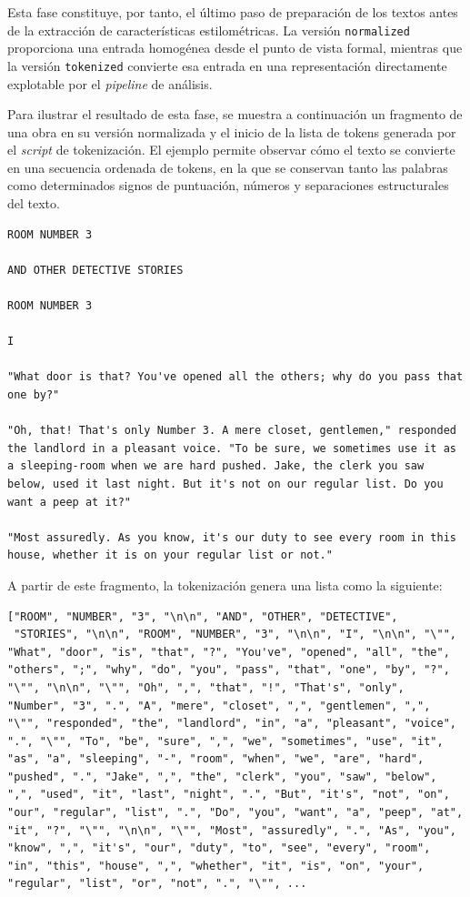 \documentclass[IB]{TFUOC}%
\begin{document}
Esta fase constituye, por tanto, el último paso de preparación de los textos antes de la extracción de características estilométricas. La versión \texttt{normalized} proporciona una entrada homogénea desde el punto de vista formal, mientras que la versión \texttt{tokenized} convierte esa entrada en una representación directamente explotable por el \textit{pipeline} de análisis.

Para ilustrar el resultado de esta fase, se muestra a continuación un fragmento de una obra en su versión normalizada y el inicio de la lista de tokens generada por el \textit{script} de tokenización. El ejemplo permite observar cómo el texto se convierte en una secuencia ordenada de tokens, en la que se conservan tanto las palabras como determinados signos de puntuación, números y separaciones estructurales del texto.

\begin{Verbatim}[breaklines=true, breakanywhere=true, breaksymbolleft={}]
ROOM NUMBER 3

AND OTHER DETECTIVE STORIES

ROOM NUMBER 3

I

"What door is that? You've opened all the others; why do you pass that one by?"

"Oh, that! That's only Number 3. A mere closet, gentlemen," responded the landlord in a pleasant voice. "To be sure, we sometimes use it as a sleeping-room when we are hard pushed. Jake, the clerk you saw below, used it last night. But it's not on our regular list. Do you want a peep at it?"

"Most assuredly. As you know, it's our duty to see every room in this house, whether it is on your regular list or not."
\end{Verbatim}

A partir de este fragmento, la tokenización genera una lista como la siguiente:

\begin{Verbatim}[breaklines=true, breakanywhere=true, breaksymbolleft={}]
["ROOM", "NUMBER", "3", "\n\n", "AND", "OTHER", "DETECTIVE",
 "STORIES", "\n\n", "ROOM", "NUMBER", "3", "\n\n", "I", "\n\n", "\"", "What", "door", "is", "that", "?", "You've", "opened", "all", "the", "others", ";", "why", "do", "you", "pass", "that", "one", "by", "?", "\"", "\n\n", "\"", "Oh", ",", "that", "!", "That's", "only", "Number", "3", ".", "A", "mere", "closet", ",", "gentlemen", ",", "\"", "responded", "the", "landlord", "in", "a", "pleasant", "voice", ".", "\"", "To", "be", "sure", ",", "we", "sometimes", "use", "it", "as", "a", "sleeping", "-", "room", "when", "we", "are", "hard", "pushed", ".", "Jake", ",", "the", "clerk", "you", "saw", "below", ",", "used", "it", "last", "night", ".", "But", "it's", "not", "on", "our", "regular", "list", ".", "Do", "you", "want", "a", "peep", "at", "it", "?", "\"", "\n\n", "\"", "Most", "assuredly", ".", "As", "you", "know", ",", "it's", "our", "duty", "to", "see", "every", "room", "in", "this", "house", ",", "whether", "it", "is", "on", "your", "regular", "list", "or", "not", ".", "\"", ...
\end{Verbatim}
\end{document}
